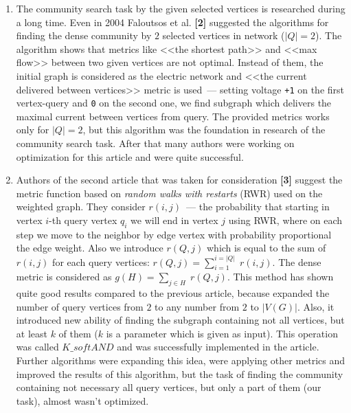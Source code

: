 \documentclass[11pt,a4paper,oneside]{article}
\begin{document}
\begin{enumerate}
  \item The community search task by the given selected vertices is researched during a long time. Even in 2004 Faloutsos et al. \textbf{[2]} suggested the algorithms for finding the dense community by $2$ selected vertices in network ($|Q| = 2$). The algorithm shows that metrics like <<the shortest path>> and <<max flow>> between two given vertices are not optimal. Instead of them, the initial graph is considered as the electric network and <<the current delivered between vertices>> metric is used~--- setting voltage \texttt{+1} on the first vertex-query and \texttt{0} on the second one, we find subgraph which delivers the maximal current between vertices from query. The provided metrics works only for $|Q| = 2$, but this algorithm was the foundation in research of the community search task. After that many authors were working on optimization for this article and were quite successful.

  \item Authors of the second article that was taken for consideration \textbf{[3]} suggest the metric function based on \textit{random walks with restarts} (RWR) used on the weighted graph. They consider $r(i, j)$~--- the probability that starting in vertex $i$-th query vertex $q_i$ we will end in vertex $j$ using RWR, where on each step we move to the neighbor by edge vertex with probability proportional the edge weight. Also we introduce $r(Q, j)$ which is equal to the sum of $r(i, j)$ for each query vertices: $r(Q, j) = \sum_{i = 1}^{i = |Q|}\; r(i, j)$. The dense metric is considered as $g(H) = \sum_{j \in H}\; r(Q, j)$. This method has shown quite good results compared to the previous article, because expanded the number of query vertices from $2$ to any number from $2$ to $|V(G)|$. Also, it introduced new ability of finding the subgraph containing not all vertices, but at least $k$ of them ($k$ is a parameter which is given as input). This operation was called $K\_softAND$ and was successfully implemented in the article. Further algorithms were expanding this idea, were applying other metrics and improved the results of this algorithm, but the task of finding the community containing not necessary all query vertices, but only a part of them (our task), almost wasn't optimized.


\end{enumerate}
\end{document}
